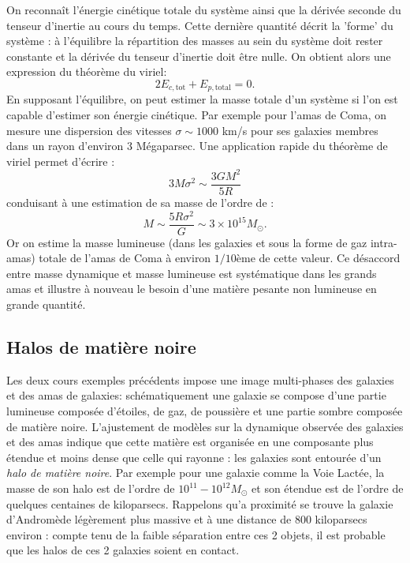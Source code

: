 On reconnaît l'énergie cinétique totale du système ainsi que la dérivée seconde du tenseur d'inertie au cours du temps. Cette dernière quantité décrit la 'forme' du système : à l'équilibre la répartition des masses au sein du système doit rester constante et la dérivée du tenseur d'inertie doit être nulle. On obtient alors une expression du théorème du viriel:
\begin{equation}
2E_{c,\mathrm{tot}} + E_{p,\mathrm{total}} =0.
\end{equation}
En supposant l'équilibre, on peut estimer la masse totale d'un système si l'on est capable d'estimer son énergie cinétique. Par exemple pour l'amas de Coma, on mesure une dispersion des vitesses $\sigma \sim 1000$ km/s pour ses galaxies membres dans un rayon d'environ 3 Mégaparsec. Une application rapide du théorème de viriel permet d'écrire  :
\begin{equation}
3M\sigma^2\sim \frac{3GM^2}{5R}
\end{equation}
conduisant à une estimation de sa masse de l'ordre de :
\begin{equation}
M\sim\frac{5R\sigma^2}{G}\sim 3\times 10^{15} M_\odot.
\end{equation}
Or on estime la masse lumineuse (dans les galaxies et sous la forme de gaz intra-amas) totale de l'amas de Coma à environ $1/10$ème de cette valeur. Ce désaccord entre masse dynamique et masse lumineuse est systématique dans les grands amas et illustre à nouveau le besoin d'une matière pesante non lumineuse en grande quantité.

\subsection{Halos de matière noire}

Les deux cours exemples précédents impose une image multi-phases des galaxies et des amas de galaxies: schématiquement une galaxie se compose d'une partie lumineuse composée d'étoiles, de gaz, de poussière et une partie sombre composée de matière noire. L'ajustement de modèles sur la dynamique observée des galaxies et des amas indique que cette matière est organisée en une composante plus étendue et moins dense que celle qui rayonne : les galaxies sont entourée d'un \textit{halo de matière noire}. Par exemple pour une galaxie comme la Voie Lactée, la masse de son halo est de l'ordre de $10^{11}-10^{12} M_\odot$ et son étendue est de l'ordre de quelques centaines de kiloparsecs. Rappelons qu'a proximité se trouve la galaxie d'Andromède légèrement plus massive et à une distance de 800 kiloparsecs environ : compte tenu de la faible séparation entre ces 2 objets, il est probable que les halos de ces 2 galaxies soient en contact.

